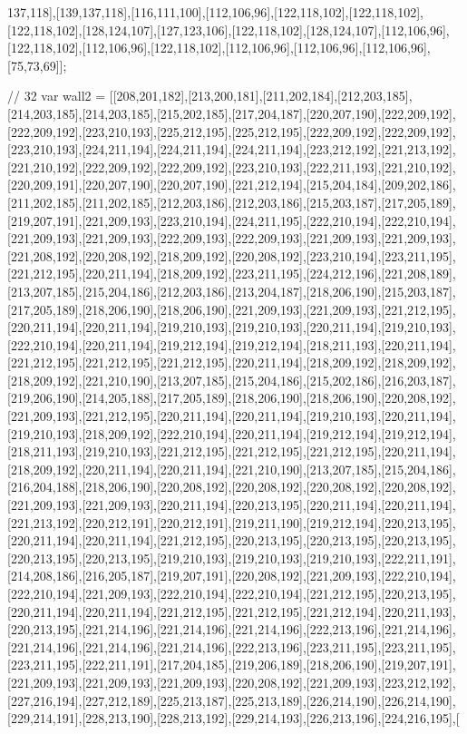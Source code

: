 137,118],[139,137,118],[116,111,100],[112,106,96],[122,118,102],[122,118,102],[122,118,102],[128,124,107],[127,123,106],[122,118,102],[128,124,107],[112,106,96],[122,118,102],[112,106,96],[122,118,102],[112,106,96],[112,106,96],[112,106,96],[75,73,69]];


// 32
var wall2 = [[208,201,182],[213,200,181],[211,202,184],[212,203,185],[214,203,185],[214,203,185],[215,202,185],[217,204,187],[220,207,190],[222,209,192],[222,209,192],[223,210,193],[225,212,195],[225,212,195],[222,209,192],[222,209,192],[223,210,193],[224,211,194],[224,211,194],[224,211,194],[223,212,192],[221,213,192],[221,210,192],[222,209,192],[222,209,192],[223,210,193],[222,211,193],[221,210,192],[220,209,191],[220,207,190],[220,207,190],[221,212,194],[215,204,184],[209,202,186],[211,202,185],[211,202,185],[212,203,186],[212,203,186],[215,203,187],[217,205,189],[219,207,191],[221,209,193],[223,210,194],[224,211,195],[222,210,194],[222,210,194],[221,209,193],[221,209,193],[222,209,193],[222,209,193],[221,209,193],[221,209,193],[221,208,192],[220,208,192],[218,209,192],[220,208,192],[223,210,194],[223,211,195],[221,212,195],[220,211,194],[218,209,192],[223,211,195],[224,212,196],[221,208,189],[213,207,185],[215,204,186],[212,203,186],[213,204,187],[218,206,190],[215,203,187],[217,205,189],[218,206,190],[218,206,190],[221,209,193],[221,209,193],[221,212,195],[220,211,194],[220,211,194],[219,210,193],[219,210,193],[220,211,194],[219,210,193],[222,210,194],[220,211,194],[219,212,194],[219,212,194],[218,211,193],[220,211,194],[221,212,195],[221,212,195],[221,212,195],[220,211,194],[218,209,192],[218,209,192],[218,209,192],[221,210,190],[213,207,185],[215,204,186],[215,202,186],[216,203,187],[219,206,190],[214,205,188],[217,205,189],[218,206,190],[218,206,190],[220,208,192],[221,209,193],[221,212,195],[220,211,194],[220,211,194],[219,210,193],[220,211,194],[219,210,193],[218,209,192],[222,210,194],[220,211,194],[219,212,194],[219,212,194],[218,211,193],[219,210,193],[221,212,195],[221,212,195],[221,212,195],[220,211,194],[218,209,192],[220,211,194],[220,211,194],[221,210,190],[213,207,185],[215,204,186],[216,204,188],[218,206,190],[220,208,192],[220,208,192],[220,208,192],[220,208,192],[221,209,193],[221,209,193],[220,211,194],[220,213,195],[220,211,194],[220,211,194],[221,213,192],[220,212,191],[220,212,191],[219,211,190],[219,212,194],[220,213,195],[220,211,194],[220,211,194],[221,212,195],[220,213,195],[220,213,195],[220,213,195],[220,213,195],[220,213,195],[219,210,193],[219,210,193],[219,210,193],[222,211,191],[214,208,186],[216,205,187],[219,207,191],[220,208,192],[221,209,193],[222,210,194],[222,210,194],[221,209,193],[222,210,194],[222,210,194],[221,212,195],[220,213,195],[220,211,194],[220,211,194],[221,212,195],[221,212,195],[221,212,194],[220,211,193],[220,213,195],[221,214,196],[221,214,196],[221,214,196],[222,213,196],[221,214,196],[221,214,196],[221,214,196],[221,214,196],[222,213,196],[223,211,195],[223,211,195],[223,211,195],[222,211,191],[217,204,185],[219,206,189],[218,206,190],[219,207,191],[221,209,193],[221,209,193],[221,209,193],[220,208,192],[221,209,193],[223,212,192],[227,216,194],[227,212,189],[225,213,187],[225,213,189],[226,214,190],[226,214,190],[229,214,191],[228,213,190],[228,213,192],[229,214,193],[226,213,196],[224,216,195],[